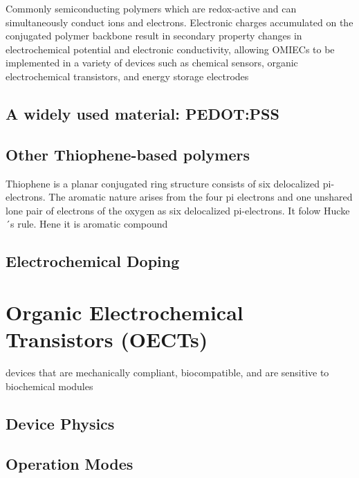 Commonly semiconducting polymers which are redox-active and can simultaneously conduct ions and electrons. Electronic charges accumulated on the conjugated polymer backbone result in secondary property changes in electrochemical potential and electronic conductivity, allowing OMIECs to be implemented in a variety of devices such as chemical sensors, organic electrochemical transistors, and energy storage electrodes \cite{tan_organic_2022}

\subsection{A widely used material: PEDOT:PSS}

\subsection{Other Thiophene-based polymers}
Thiophene is a planar conjugated ring structure consists of six delocalized pi-electrons. The aromatic nature arises from the four pi electrons and one unshared lone pair of electrons of the oxygen as six delocalized pi-electrons. It folow Hucke´s rule. Hene it is aromatic compound

\subsection{Electrochemical Doping}

\section{Organic Electrochemical Transistors (OECTs)}

devices that are mechanically compliant, biocompatible, and are sensitive to biochemical modules \cite{tan_organic_2022}

\subsection{Device Physics}

\subsection{Operation Modes}


